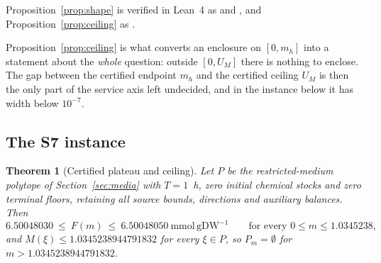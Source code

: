 \documentclass[11pt,a4paper]{article}
\theoremstyle{plain}
\newtheorem{theorem}{Theorem}[section]
\theoremstyle{definition}
\theoremstyle{remark}
\newcommand{\mmolg}{\mathrm{mmol}\,\mathrm{gDW}^{-1}}
\begin{document}
Proposition~\ref{prop:shape} is verified in Lean~4 as
 and , and
Proposition~\ref{prop:ceiling} as .

Proposition~\ref{prop:ceiling} is what converts an enclosure on $[0,m_h]$ into
a statement about the \emph{whole} question: outside $[0,U_M]$ there is nothing
to enclose. The gap between the certified endpoint $m_h$ and the certified
ceiling $U_M$ is then the only part of the service axis left undecided, and in
the instance below it has width below $10^{-7}$.

\subsection{The S7 instance}
\begin{theorem}[Certified plateau and ceiling]\label{thm:plateau}
Let $P$ be the restricted-medium polytope of Section~\ref{sec:media} with
$T=1$~h, zero initial chemical stocks and zero terminal floors, retaining all
source bounds, directions and auxiliary balances. Then
\begin{equation}\label{eq:plateau}
6.50048030\ \le\ F(m)\ \le\ 6.50048050\ \mmolg
\qquad\text{for every } 0\le m\le 1.0345238 ,
\end{equation}
and $M(\xi)\le 1.0345238944791832$ for every $\xi\in P$, so $P_m=\emptyset$ for
$m>1.0345238944791832$.
\end{theorem}
\end{document}
